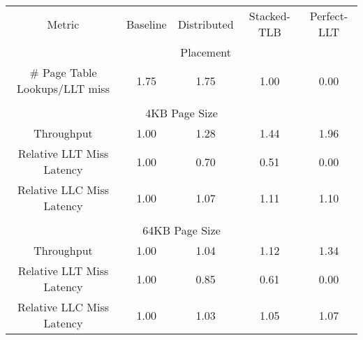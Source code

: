 \begin {table*}[tp]
\small
\begin{center} 
\vspace{-0. in}
\caption{Summary of Distributed Placement and Stacked-TLBs for Different
Performance Metrics}
\vspace{-0. in}
\begin{tabular}{| c | c | c | c | c | }
\hline
Metric & Baseline & Distributed & Stacked-TLB & Perfect-LLT \\
       &          &  Placement  &             &             \\\hline
\# Page Table Lookups/LLT miss  & 1.75 & 1.75 & 1.00 &0.00 \\\hline
\multicolumn{5}{|c|}{ } \\ \hline
\multicolumn{5}{|c|}{ 4KB Page Size} \\ \hline
Throughput                            & 1.00 & 1.28 & 1.44 & 1.96 \\\hline
Relative LLT Miss Latency             & 1.00 & 0.70 & 0.51 & 0.00 \\\hline
Relative LLC Miss Latency             & 1.00 & 1.07 & 1.11 & 1.10 \\ \hline
\multicolumn{5}{|c|}{ } \\ \hline
\multicolumn{5}{|c|}{ 64KB Page Size} \\ \hline
Throughput                            & 1.00 & 1.04 & 1.12  & 1.34 \\\hline
Relative LLT Miss Latency             & 1.00 & 0.85 & 0.61  & 0.00 \\\hline
Relative LLC Miss Latency             & 1.00 & 1.03 & 1.05  & 1.07 \\ \hline

\end{tabular}
\label{table:results_summary}
\vspace{-0.015 in}
\end{center}
\normalsize
\end{table*}
